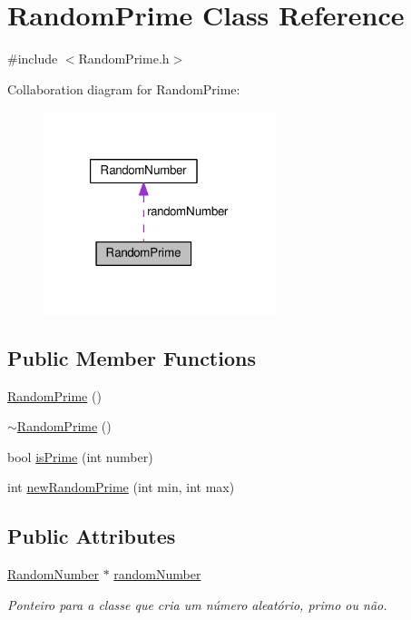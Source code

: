 \hypertarget{classRandomPrime}{\section{Random\+Prime Class Reference}
\label{classRandomPrime}
}


{\ttfamily \#include $<$Random\+Prime.\+h$>$}



Collaboration diagram for Random\+Prime\+:\nopagebreak
\begin{figure}[H]
\begin{center}
\leavevmode
\includegraphics[width=193pt]{classRandomPrime__coll__graph}
\end{center}
\end{figure}
\subsection*{Public Member Functions}
\begin{DoxyCompactItemize}
\item 
\hyperlink{classRandomPrime_a941dadf444034d5cd4918f0f9ec6c1f5}{Random\+Prime} ()
\item 
\hyperlink{classRandomPrime_a5c42d9687ece6ea0cdee8ac0dd949f51}{$\sim$\+Random\+Prime} ()
\item 
bool \hyperlink{classRandomPrime_ad5dcc20963dcb83120db6e2c93749585}{is\+Prime} (int number)
\item 
int \hyperlink{classRandomPrime_a322ce83f7af45e67d009ff3ed19d0047}{new\+Random\+Prime} (int min, int max)
\end{DoxyCompactItemize}
\subsection*{Public Attributes}
\begin{DoxyCompactItemize}
\item 
\hyperlink{classRandomNumber}{Random\+Number} $\ast$ \hyperlink{classRandomPrime_aed4cde44e5f33444c1d0e02d061a6a22}{random\+Number}
\begin{DoxyCompactList}\small\item\em Ponteiro para a classe que cria um número aleatório, primo ou não. \end{DoxyCompactList}\end{DoxyCompactItemize}


